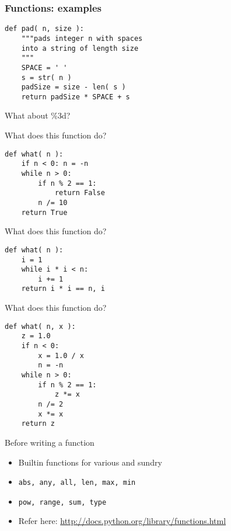 \documentclass[14pt,compress]{beamer}
\newcounter{time}
\newcommand{\inctime}[1]{\addtocounter{time}{#1}{\tiny \thetime\ m}}
\newcommand{\typ}[1]{\texttt{#1}}
\begin{document}
\begin{frame}[fragile]
  \frametitle{Functions: examples}
  \begin{lstlisting}
def pad( n, size ): 
    """pads integer n with spaces
    into a string of length size
    """
    SPACE = ' '
    s = str( n )
    padSize = size - len( s )
    return padSize * SPACE + s
  \end{lstlisting}
\pause
What about \%3d?
\end{frame}

\begin{frame}[fragile]
  {What does this function do?}
  \begin{lstlisting}
def what( n ):
    if n < 0: n = -n
    while n > 0:
        if n % 2 == 1:
            return False
        n /= 10
    return True
  \end{lstlisting}
\end{frame}

\begin{frame}[fragile]
  {What does this function do?}
\begin{lstlisting}
def what( n ):
    i = 1    
    while i * i < n:
        i += 1
    return i * i == n, i
  \end{lstlisting}
\end{frame}

\begin{frame}[fragile]
  {What does this function do?}
  \begin{lstlisting}
def what( n, x ):
    z = 1.0
    if n < 0:
        x = 1.0 / x
        n = -n
    while n > 0:
        if n % 2 == 1:
            z *= x
        n /= 2
        x *= x
    return z
  \end{lstlisting}
\end{frame}

\begin{frame}
  {Before writing a function}
  \begin{itemize}
      \item Builtin functions for various and sundry
      \item \typ{abs, any, all, len, max, min}
      \item \typ{pow, range, sum, type}
      \item Refer here:
          \url{http://docs.python.org/library/functions.html}
  \end{itemize}
  \inctime{15} 
\end{frame}
\end{document}

